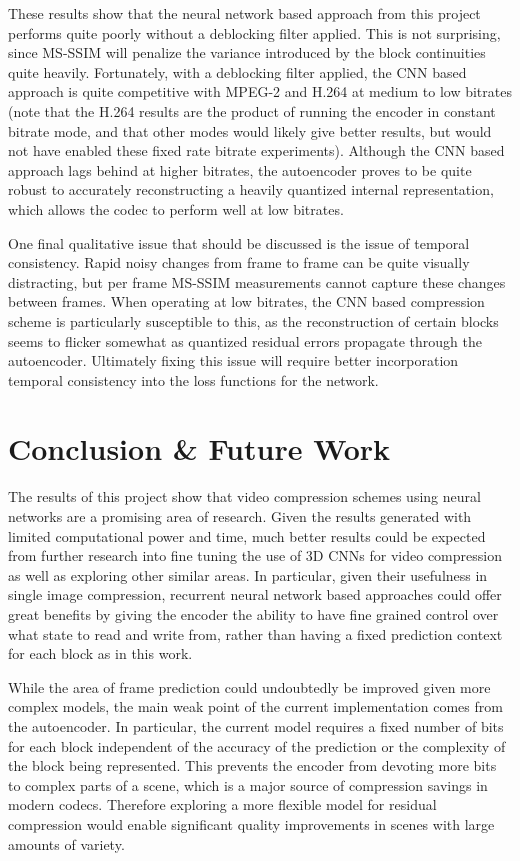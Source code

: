 \documentclass[10pt,twocolumn,letterpaper]{article}
\begin{document}
These results show that the neural network based approach from this project performs quite poorly without a deblocking filter applied. This is not surprising, since MS-SSIM will penalize the variance introduced by the block continuities quite heavily. Fortunately, with a deblocking filter applied, the CNN based approach is quite competitive with MPEG-2 and H.264 at medium to low bitrates (note that the H.264 results are the product of running the encoder in constant bitrate mode, and that other modes would likely give better results, but would not have enabled these fixed rate bitrate experiments). Although the CNN based approach lags behind at higher bitrates, the autoencoder proves to be quite robust to accurately reconstructing a heavily quantized internal representation, which allows the codec to perform well at low bitrates.

One final qualitative issue that should be discussed is the issue of temporal consistency. Rapid noisy changes from frame to frame can be quite visually distracting, but per frame MS-SSIM measurements cannot capture these changes between frames. When operating at low bitrates, the CNN based compression scheme is particularly susceptible to this, as the reconstruction of certain blocks seems to flicker somewhat as quantized residual errors propagate through the autoencoder. Ultimately fixing this issue will require better incorporation temporal consistency into the loss functions for the network.


\section{Conclusion \& Future Work}
The results of this project show that video compression schemes using neural networks are a promising area of research. Given the results generated with limited computational power and time, much better results could be expected from further research into fine tuning the use of 3D CNNs for video compression as well as exploring other similar areas. In particular, given their usefulness in single image compression, recurrent neural network based approaches could offer great benefits by giving the encoder the ability to have fine grained control over what state to read and write from, rather than having a fixed prediction context for each block as in this work.

While the area of frame prediction could undoubtedly be improved given more complex models, the main weak point of the current implementation comes from the autoencoder. In particular, the current model requires a fixed number of bits for each block independent of the accuracy of the prediction or the complexity of the block being represented. This prevents the encoder from devoting more bits to complex parts of a scene, which is a major source of compression savings in modern codecs. Therefore exploring a more flexible model for residual compression would enable significant quality improvements in scenes with large amounts of variety.
\end{document}
